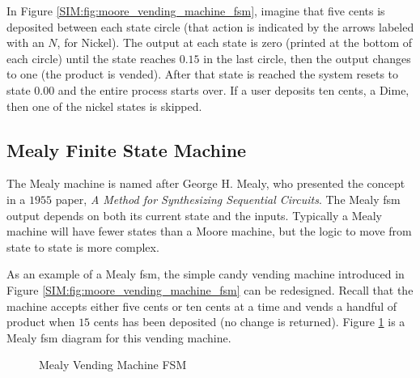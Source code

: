 In Figure \ref{SIM:fig:moore_vending_machine_fsm}, imagine that five cents is deposited between each state circle (that action is indicated by the arrows labeled with an $ N $, for Nickel). The output at each state is zero (printed at the bottom of each circle) until the state reaches $ 0.15 $ in the last circle, then the output changes to one (the product is vended). After that state is reached the system resets to state $ 0.00 $ and the entire process starts over. If a user deposits ten cents, a Dime, then one of the nickel states is skipped.

\subsection{Mealy Finite State Machine}
\label{SIM:subsec:mealy_finite_state_machines}

The Mealy machine is named after George H. Mealy, who presented the concept in a $ 1955 $ paper, \emph{A Method for Synthesizing Sequential Circuits}. The Mealy \gls{fsm} output depends on both its current state and the inputs. Typically a Mealy machine will have fewer states than a Moore machine, but the logic to move from state to state is more complex. 

As an example of a Mealy \gls{fsm}, the simple candy vending machine introduced in Figure \ref{SIM:fig:moore_vending_machine_fsm} can be redesigned. Recall that the machine accepts either five cents or ten cents at a time and vends a handful of product when $ 15 $ cents has been deposited (no change is returned). Figure \ref{SIM:fig:mealy_vending_machine_fsm} is a Mealy \gls{fsm} diagram for this vending machine.

\begin{figure}[H]
  \caption{Mealy Vending Machine FSM}
  \label{SIM:fig:mealy_vending_machine_fsm}
  \myfloatalign
\end{figure}

